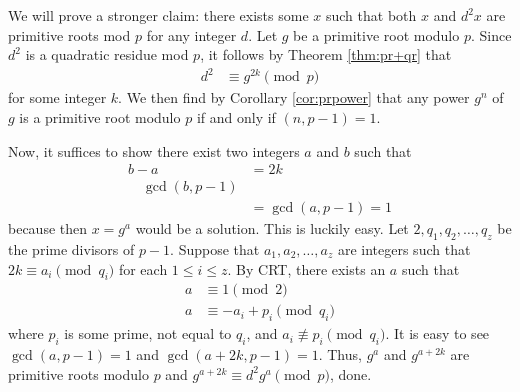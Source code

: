 \documentclass{subfile}
\begin{document}
	\begin{solution}
		We will prove a stronger claim: there exists some $x$ such that both $x$ and $d^2x$ are primitive roots mod $p$ for any integer $d$. Let $g$ be a primitive root modulo $p$. Since $d^2$ is a quadratic residue mod $p$, it follows by Theorem \ref{thm:pr+qr} that
			\begin{align*}
				d^2
					& \equiv g^{2k} \pmod{p}
			\end{align*}
		for some integer $k$. We then find by Corollary \ref{cor:prpower} that any power $g^n$ of $g$ is a primitive root modulo $p$ if and only if $(n, p-1)=1$.

		Now, it suffices to show there exist two integers $a$ and $b$ such that
			\begin{align*}
				b-a
					& = 2k\\
				\quad \gcd(b,p-1)\\
					& = \gcd(a,p-1) = 1
			\end{align*}
		because then $x=g^a$ would be a solution.
		This is luckily easy. Let $2,q_1,q_2,\ldots,q_z$ be the prime divisors of $p-1$. Suppose that $a_1,a_2,\ldots,a_z$ are integers such that $2k \equiv a_i \pmod{q_i}$ for each $1 \le i \le z$.
		By CRT, there exists an $a$ such that
			\begin{align*}
				a
					& \equiv 1 \pmod{2}\\
				a
					& \equiv -a_i + p_i \pmod{q_i}
			\end{align*}
		where $p_i$ is some prime, not equal to $q_i$, and $a_i \not \equiv p_i \pmod{q_i}$. It is easy to see $\gcd(a,p-1) = 1$ and $\gcd(a+2k, p-1) = 1$. Thus, $g^a$ and $g^{a+2k}$ are primitive roots modulo $p$ and $g^{a+2k} \equiv d^2g^a \pmod{p}$, done.
	\end{solution}
\end{document}
